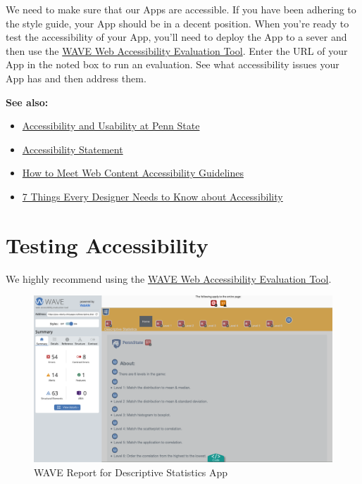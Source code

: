 \documentclass[
]{book}
\providecommand{\tightlist}{%
  \setlength{\itemsep}{0pt}\setlength{\parskip}{0pt}}
\begin{document}
We need to make sure that our Apps are accessible. If you have been adhering to the style guide, your App should be in a decent position. When you're ready to test the accessibility of your App, you'll need to deploy the App to a sever and then use the \href{https://wave.webaim.org/}{WAVE Web Accessibility Evaluation Tool}. Enter the URL of your App in the noted box to run an evaluation. See what accessibility issues your App has and then address them.

\textbf{See also:}

\begin{itemize}
\tightlist
\item
  \href{https://accessibility.psu.edu/}{Accessibility and Usability at Penn
  State}
\item
  \href{https://www.psu.edu/accessibilitystatement}{Accessibility
  Statement}
\item
  \href{https://www.w3.org/WAI/WCAG21/quickref/}{How to Meet Web Content Accessibility
  Guidelines}
\item
  \href{https://medium.com/salesforce-ux/7-things-every-designer-needs-to-know-about-accessibility-64f105f0881b}{7 Things Every Designer Needs to Know about Accessibility}
\end{itemize}

\hypertarget{testing-accessibility}{%
\section{Testing Accessibility}\label{testing-accessibility}}

We highly recommend using the \href{https://wave.webaim.org/}{WAVE Web Accessibility Evaluation Tool}.

\begin{figure}

{\centering \includegraphics[width=22.85in]{images/descStatOverview} 

}

\caption{WAVE Report for Descriptive Statistics App}\label{fig:waveDescStat}
\end{figure}
\end{document}
